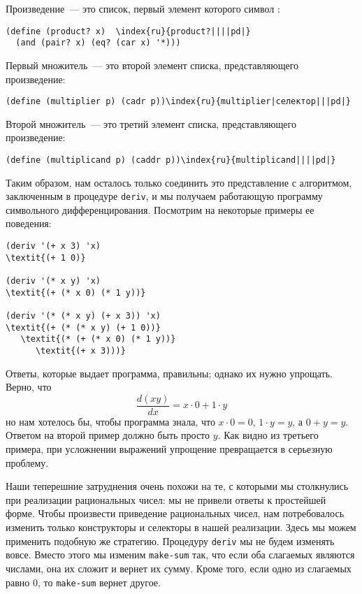 \begin{plainlist}
\item
Произведение~--- это список, первый элемент
которого символ {\tt *}:

\begin{Verbatim}[fontsize=\small]
(define (product? x)  \index{ru}{product?||||pd|}
  (and (pair? x) (eq? (car x) '*)))
\end{Verbatim}

\item
Первый множитель~--- это второй элемент списка,
представляющего произведение:

\begin{Verbatim}[fontsize=\small]
(define (multiplier p) (cadr p))\index{ru}{multiplier|селектор|||pd|}
\end{Verbatim}

\item
Второй множитель~--- это третий элемент списка,
представляющего произведение:

\begin{Verbatim}[fontsize=\small]
(define (multiplicand p) (caddr p))\index{ru}{multiplicand||||pd|}
\end{Verbatim}
\end{plainlist}
Таким образом, нам осталось только соединить это представление с
алгоритмом, заключенным в процедуре {\tt deriv}, и мы получаем
работающую программу символьного дифференцирования.  Посмотрим на
некоторые примеры ее поведения:

\begin{Verbatim}[fontsize=\small]
(deriv '(+ x 3) 'x)
\textit{(+ 1 0)}

(deriv '(* x y) 'x)
\textit{(+ (* x 0) (* 1 y))}

(deriv '(* (* x y) (+ x 3)) 'x)
\textit{(+ (* (* x y) (+ 1 0))}
   \textit{(* (+ (* x 0) (* 1 y))}
      \textit{(+ x 3)))}
\end{Verbatim}
Ответы, которые выдает программа, правильны; однако их нужно
упрощать.  Верно, что
$$
  \frac{d(xy)}{dx} = x \cdot 0 + 1 \cdot y
$$
но нам хотелось бы, чтобы программа знала, что $x \cdot 0 =
0$, $1 \cdot y = y$, а $0 + y =
y$. Ответом на второй пример должно быть просто $y$.
Как видно из третьего примера, при усложнении выражений упрощение 
превращается в серьезную проблему.

Наши теперешние затруднения очень похожи на те, с которыми 
мы столкнулись при реализации рациональных чисел: мы не привели ответы к 
простейшей форме.  Чтобы произвести приведение рациональных чисел, нам 
потребовалось изменить только конструкторы и селекторы в нашей
реализации.  Здесь мы можем применить подобную же стратегию.
Процедуру {\tt deriv} мы не будем изменять вовсе.  Вместо этого 
мы изменим {\tt make-sum} так, что если оба слагаемых являются
числами, она их сложит и вернет их сумму.  Кроме того, если одно из
слагаемых равно 0, то {\tt make-sum} вернет другое.

